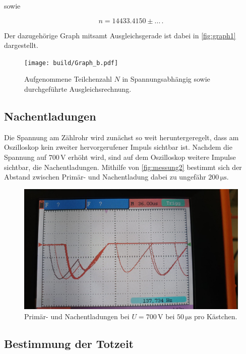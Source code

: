 sowie

\begin{equation*}
      n = 14433.4150 \pm ... \,.
\end{equation*}

Der dazugehörige Graph mitsamt Ausgleichsgerade ist dabei in \autoref{fig:graph1} dargestellt.

\begin{figure}
    \centering
    \texttt{[image: build/Graph\_b.pdf]}
    \caption{Aufgenommene Teilchenzahl $N$ in Spannungsabhängig sowie durchgeführte Ausgleichsrechnung.}
    \label{fig:graph1}
\end{figure}


\subsection{Nachentladungen}

Die Spannung am Zählrohr wird zunächst so weit heruntergeregelt, dass am Oszilloskop kein zweiter hervorgerufener Impuls sichtbar ist.
Nachdem die Spannung auf $700 \,\unit{\volt}$ erhöht wird, sind auf dem Oszilloskop weitere Impulse sichtbar, die Nachentladungen.
Mithilfe von \autoref{fig:messung2} bestimmt sich der Abstand zwischen Primär- und Nachentladung dabei zu ungefähr $200 \,\unit{\micro\second}$.

\begin{figure}
    \centering
    \includegraphics[scale=0.2]{figures/messung2.jpeg}
    \caption{Primär- und Nachentladungen bei $U = 700 \,\unit{\volt}$ bei $50 \,\unit{\micro\second}$ pro Kästchen.}
    \label{fig:messung2}
\end{figure}


\subsection{Bestimmung der Totzeit}

